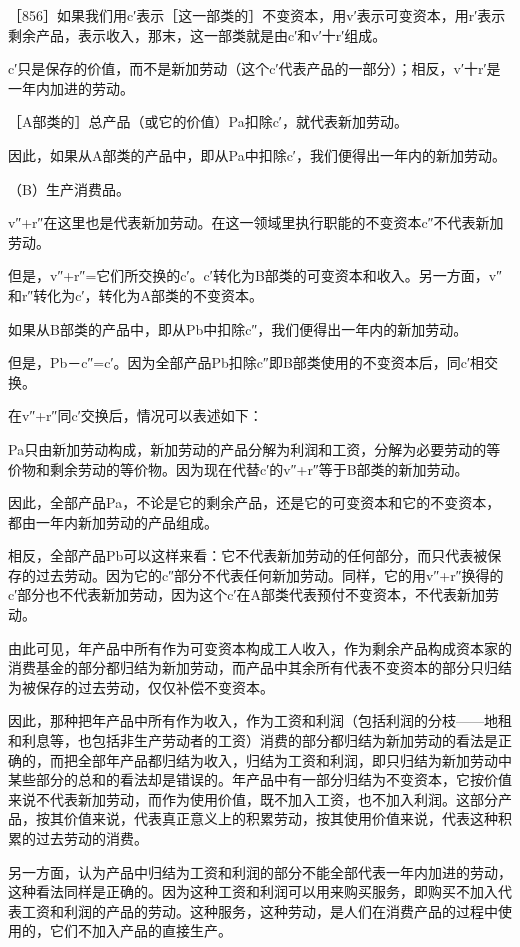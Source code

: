 ［856］如果我们用c′表示［这一部类的］不变资本，用v′表示可变资本，用r′表示剩余产品，表示收入，那末，这一部类就是由c′和v′十r′组成。

c′只是保存的价值，而不是新加劳动（这个c′代表产品的一部分）；相反，v′十r′是一年内加进的劳动。

［A部类的］总产品（或它的价值）Pa扣除c′，就代表新加劳动。

因此，如果从A部类的产品中，即从Pa中扣除c′，我们便得出一年内的新加劳动。

（B）生产消费品。

v″+r″在这里也是代表新加劳动。在这一领域里执行职能的不变资本c″不代表新加劳动。

但是，v″+r″=它们所交换的c′。c′转化为B部类的可变资本和收入。另一方面，v″和r″转化为c′，转化为A部类的不变资本。

如果从B部类的产品中，即从Pb中扣除c″，我们便得出一年内的新加劳动。

但是，Pb－c″=c′。因为全部产品Pb扣除c″即B部类使用的不变资本后，同c′相交换。

在v″+r″同c′交换后，情况可以表述如下：

Pa只由新加劳动构成，新加劳动的产品分解为利润和工资，分解为必要劳动的等价物和剩余劳动的等价物。因为现在代替c′的v″+r″等于B部类的新加劳动。

因此，全部产品Pa，不论是它的剩余产品，还是它的可变资本和它的不变资本，都由一年内新加劳动的产品组成。

相反，全部产品Pb可以这样来看：它不代表新加劳动的任何部分，而只代表被保存的过去劳动。因为它的c″部分不代表任何新加劳动。同样，它的用v″+r″换得的c′部分也不代表新加劳动，因为这个c′在A部类代表预付不变资本，不代表新加劳动。

由此可见，年产品中所有作为可变资本构成工人收入，作为剩余产品构成资本家的消费基金的部分都归结为新加劳动，而产品中其余所有代表不变资本的部分只归结为被保存的过去劳动，仅仅补偿不变资本。

因此，那种把年产品中所有作为收入，作为工资和利润（包括利润的分枝——地租和利息等，也包括非生产劳动者的工资）消费的部分都归结为新加劳动的看法是正确的，而把全部年产品都归结为收入，归结为工资和利润，即只归结为新加劳动中某些部分的总和的看法却是错误的。年产品中有一部分归结为不变资本，它按价值来说不代表新加劳动，而作为使用价值，既不加入工资，也不加入利润。这部分产品，按其价值来说，代表真正意义上的积累劳动，按其使用价值来说，代表这种积累的过去劳动的消费。

另一方面，认为产品中归结为工资和利润的部分不能全部代表一年内加进的劳动，这种看法同样是正确的。因为这种工资和利润可以用来购买服务，即购买不加入代表工资和利润的产品的劳动。这种服务，这种劳动，是人们在消费产品的过程中使用的，它们不加入产品的直接生产。

